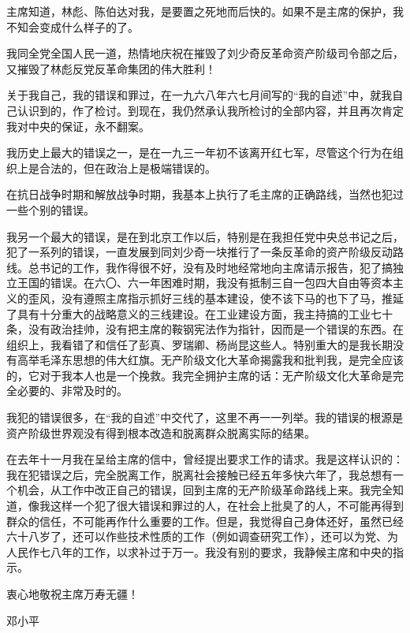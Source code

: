 \begin{maonote}
主席知道，林彪、陈伯达对我，是要置之死地而后快的。如果不是主席的保护，我不知会变成什么样子的了。

我同全党全国人民一道，热情地庆祝在摧毁了刘少奇反革命资产阶级司令部之后，又摧毁了林彪反党反革命集团的伟大胜利！

关于我自己，我的错误和罪过，在一九六八年六七月间写的“我的自述”中，就我自己认识到的，作了检讨。到现在，我仍然承认我所检讨的全部内容，并且再次肯定我对中央的保证，永不翻案。

我历史上最大的错误之一，是在一九三一年初不该离开红七军，尽管这个行为在组织上是合法的，但在政治上是极端错误的。

在抗日战争时期和解放战争时期，我基本上执行了毛主席的正确路线，当然也犯过一些个别的错误。

我另一个最大的错误，是在到北京工作以后，特别是在我担任党中央总书记之后，犯了一系列的错误，一直发展到同刘少奇一块推行了一条反革命的资产阶级反动路线。总书记的工作，我作得很不好，没有及时地经常地向主席请示报告，犯了搞独立王国的错误。在六〇、六一年困难时期，我没有抵制三自一包四大自由等资本主义的歪风，没有遵照主席指示抓好三线的基本建设，使不该下马的也下了马，推延了具有十分重大的战略意义的三线建设。在工业建设方面，我主持搞的工业七十条，没有政治挂帅，没有把主席的鞍钢宪法作为指针，因而是一个错误的东西。在组织上，我看错了和信任了彭真、罗瑞卿、杨尚昆这些人。特别重大的是我长期没有高举毛泽东思想的伟大红旗。无产阶级文化大革命揭露我和批判我，是完全应该的，它对于我本人也是一个挽救。我完全拥护主席的话：无产阶级文化大革命是完全必要的、非常及时的。

我犯的错误很多，在“我的自述”中交代了，这里不再一一列举。我的错误的根源是资产阶级世界观没有得到根本改造和脱离群众脱离实际的结果。

在去年十一月我在呈给主席的信中，曾经提出要求工作的请求。我是这样认识的：我在犯错误之后，完全脱离工作，脱离社会接触已经五年多快六年了，我总想有一个机会，从工作中改正自己的错误，回到主席的无产阶级革命路线上来。我完全知道，像我这样一个犯了很大错误和罪过的人，在社会上批臭了的人，不可能再得到群众的信任，不可能再作什么重要的工作。但是，我觉得自己身体还好，虽然已经六十八岁了，还可以作些技术性质的工作（例如调查研究工作），还可以为党、为人民作七八年的工作，以求补过于万一。我没有别的要求，我静候主席和中央的指示。

衷心地敬祝主席万寿无疆！

邓小平


\end{maonote}
